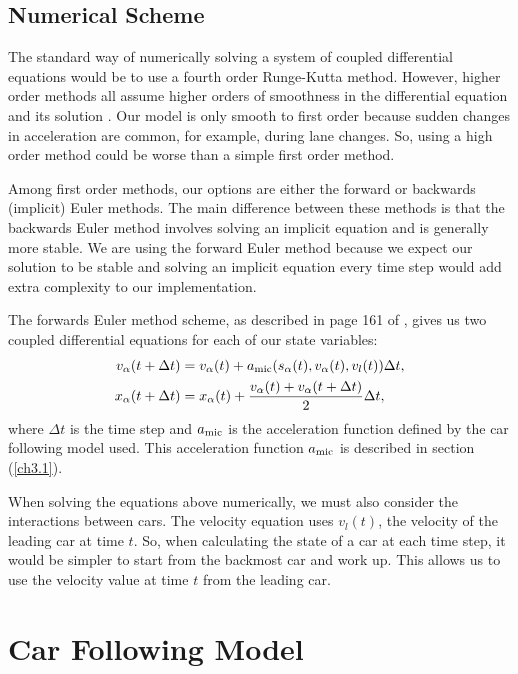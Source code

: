 \documentclass[12pt]{article}
\begin{document}
    \subsection{Numerical Scheme}\label{num_sch}
    The standard way of numerically solving a system of coupled differential equations would be to use a fourth order Runge-Kutta method.
    However, higher order methods all assume higher orders of smoothness in the differential equation and its solution \cite{numerics}.
    Our model is only smooth to first order because sudden changes in acceleration are common, for example, during lane changes. 
    So, using a high order method could be worse than a simple first order method.

    Among first order methods, our options are either the forward or backwards (implicit) Euler methods. The main difference between these methods is that the backwards Euler method involves solving an implicit equation and is generally more stable. 
    We are using the forward Euler method because we expect our solution to be stable and solving an implicit equation every time step would add extra complexity to our implementation.

    The forwards Euler method scheme, as described in page 161 of \cite{traffic}, gives us two coupled differential equations for each of our state variables:
    \begin{align}
        v_\alpha(t+\Delta t) &= v_\alpha(t) +a_{\rm mic}(s_\alpha(t), v_\alpha (t), v_l (t))\Delta t, \label{num_eq1}\\
        x_\alpha(t + \Delta t) &= x_\alpha(t) + \frac{v_\alpha (t) + v_\alpha (t+\Delta t)}{2}\Delta t \label{num_eq2},
    \end{align}
    where $\Delta t$ is the time step and $a_{\rm mic}$ is the acceleration function defined by the car following model used.  This acceleration function $a_{\rm mic}$ is described in section (\ref{ch3.1}).

    When solving the equations above numerically, we must also consider the interactions between cars. The velocity equation uses $v_l(t)$, the velocity of the leading car at time $t$. So, when calculating the state of a car at each time step, it would be simpler to start from the backmost car and work up. This allows us to use the velocity value at time $t$ from the leading car.     
    \section{Car Following Model}
\end{document}
